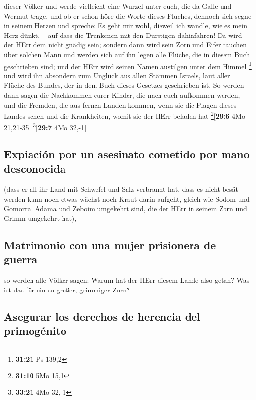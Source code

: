 dieser Völker und werde vielleicht eine Wurzel unter euch, die da Galle
und Wermut trage,  und ob er schon höre die Worte dieses
Fluches, dennoch sich segne in seinem Herzen und spreche: Es geht mir
wohl, dieweil ich wandle, wie es mein Herz dünkt, -- auf dass die
Trunkenen mit den Durstigen dahinfahren!  Da wird der
HErr dem nicht gnädig sein; sondern dann wird sein Zorn und Eifer
rauchen über solchen Mann und werden sich auf ihn legen alle Flüche, die
in diesem Buch geschrieben sind; und der HErr wird seinen Namen
austilgen unter dem Himmel \footnote{\textbf{31:21} Ps 139,2}
 und wird ihn absondern zum Unglück aus allen Stämmen
Israels, laut aller Flüche des Bundes, der in dem Buch dieses Gesetzes
geschrieben ist.  So werden dann sagen die Nachkommen
eurer Kinder, die nach euch aufkommen werden, und die Fremden, die aus
fernen Landen kommen, wenn sie die Plagen dieses Landes sehen und die
Krankheiten, womit sie der HErr beladen hat \footnote{\textbf{31:10} 5Mo
  15,1}{[}\textbf{29:6} 4Mo 21,21-35{]} \footnote{\textbf{33:21} 4Mo
  32,-1}{[}\textbf{29:7} 4Mo 32,-1{]}

\hypertarget{expiaciuxf3n-por-un-asesinato-cometido-por-mano-desconocida}{%
\subsection{Expiación por un asesinato cometido por mano
desconocida}\label{expiaciuxf3n-por-un-asesinato-cometido-por-mano-desconocida}}

 (dass er all ihr Land mit Schwefel und Salz verbrannt
hat, dass es nicht besät werden kann noch etwas wächst noch Kraut darin
aufgeht, gleich wie Sodom und Gomorra, Adama und Zeboim umgekehrt sind,
die der HErr in seinem Zorn und Grimm umgekehrt hat),

\hypertarget{matrimonio-con-una-mujer-prisionera-de-guerra}{%
\subsection{Matrimonio con una mujer prisionera de
guerra}\label{matrimonio-con-una-mujer-prisionera-de-guerra}}

 so werden alle Völker sagen: Warum hat der HErr diesem
Lande also getan? Was ist das für ein so großer, grimmiger Zorn?

\hypertarget{asegurar-los-derechos-de-herencia-del-primoguxe9nito}{%
\subsection{Asegurar los derechos de herencia del
primogénito}\label{asegurar-los-derechos-de-herencia-del-primoguxe9nito}}

